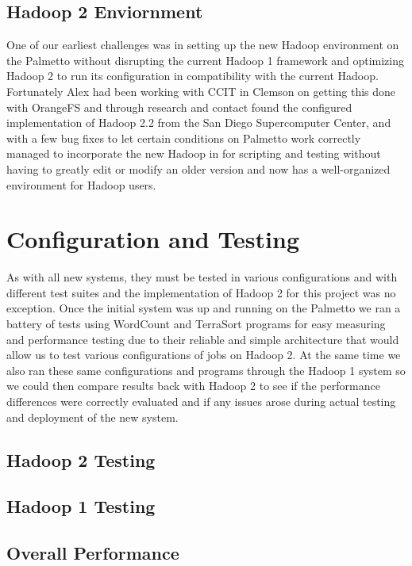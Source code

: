 \documentclass[conference]{IEEEtran}
\begin{document}
			\subsection{Hadoop 2 Enviornment}
				One of our earliest challenges was in setting up the new Hadoop environment on the Palmetto without disrupting the current Hadoop 1 framework and optimizing Hadoop 2 to run its configuration in compatibility with the current Hadoop.  Fortunately Alex had been working with CCIT in Clemson on getting this done with OrangeFS and through research and contact found the configured implementation of Hadoop 2.2 from the San Diego Supercomputer Center, and with a few bug fixes to let certain conditions on Palmetto work correctly managed to incorporate the new Hadoop in for scripting and testing without having to greatly edit or modify an older version and now has a well-organized environment for Hadoop users.

		\section{Configuration and Testing}
			As with all new systems, they must be tested in various configurations and with different test suites and the implementation of Hadoop 2 for this project was no exception.  Once the initial system was up and running on the Palmetto we ran a battery of tests using WordCount and TerraSort programs for easy measuring and performance testing due to their reliable and simple architecture that would allow us to test various configurations of jobs on Hadoop 2.  At the same time we also ran these same configurations and programs through the Hadoop 1 system so we could then compare results back with Hadoop 2 to see if the performance differences were correctly evaluated and if any issues arose during actual testing and deployment of the new system.
			\subsection{Hadoop 2 Testing}
			\subsection{Hadoop 1 Testing}
			\subsection{Overall Performance}
\end{document}
